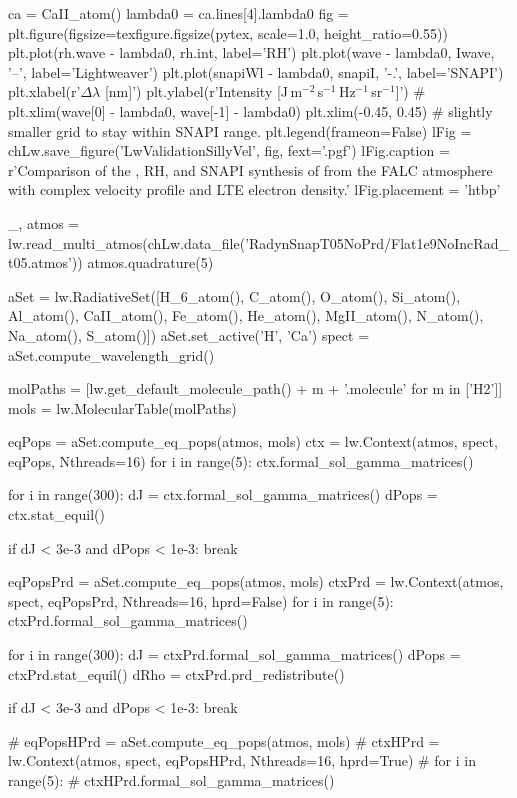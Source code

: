 \begin{pycode}[Lw]
ca = CaII_atom()
lambda0 = ca.lines[4].lambda0
fig = plt.figure(figsize=texfigure.figsize(pytex, scale=1.0, height_ratio=0.55))
plt.plot(rh.wave - lambda0, rh.int, label='RH')
plt.plot(wave - lambda0, Iwave, '--', label='Lightweaver')
plt.plot(snapiWl - lambda0, snapiI, '-.', label='SNAPI')
plt.xlabel(r'$\Delta\lambda$ [nm]')
plt.ylabel(r'Intensity [J\,m$^{-2}$\,s$^{-1}$\,Hz$^{-1}$\,sr$^{-1}$]')
# plt.xlim(wave[0] - lambda0, wave[-1] - lambda0)
plt.xlim(-0.45, 0.45) # slightly smaller grid to stay within SNAPI range.
plt.legend(frameon=False)
lFig = chLw.save_figure('LwValidationSillyVel', fig, fext='.pgf')
lFig.caption = r'Comparison of the \Lw{}, RH, and SNAPI synthesis of \CaLine{} from the FALC atmosphere with complex velocity profile and LTE electron density.'
lFig.placement = 'htbp'
\end{pycode}
\begin{pycode}[Lw]

_, atmos = lw.read_multi_atmos(chLw.data_file('RadynSnapT05NoPrd/Flat1e9NoIncRad_t05.atmos'))
atmos.quadrature(5)

aSet = lw.RadiativeSet([H_6_atom(), C_atom(), O_atom(), Si_atom(), Al_atom(),
                        CaII_atom(), Fe_atom(), He_atom(), MgII_atom(), N_atom(),
                        Na_atom(), S_atom()])
aSet.set_active('H', 'Ca')
spect = aSet.compute_wavelength_grid()

molPaths = [lw.get_default_molecule_path() + m + '.molecule' for m in ['H2']]
mols = lw.MolecularTable(molPaths)

eqPops = aSet.compute_eq_pops(atmos, mols)
ctx = lw.Context(atmos, spect, eqPops, Nthreads=16)
for i in range(5):
    ctx.formal_sol_gamma_matrices()

for i in range(300):
    dJ = ctx.formal_sol_gamma_matrices()
    dPops = ctx.stat_equil()

    if dJ < 3e-3 and dPops < 1e-3:
        break

eqPopsPrd = aSet.compute_eq_pops(atmos, mols)
ctxPrd = lw.Context(atmos, spect, eqPopsPrd, Nthreads=16, hprd=False)
for i in range(5):
    ctxPrd.formal_sol_gamma_matrices()

for i in range(300):
    dJ = ctxPrd.formal_sol_gamma_matrices()
    dPops = ctxPrd.stat_equil()
    dRho = ctxPrd.prd_redistribute()

    if dJ < 3e-3 and dPops < 1e-3:
        break

# eqPopsHPrd = aSet.compute_eq_pops(atmos, mols)
# ctxHPrd = lw.Context(atmos, spect, eqPopsHPrd, Nthreads=16, hprd=True)
# for i in range(5):
#     ctxHPrd.formal_sol_gamma_matrices()


\end{pycode}
